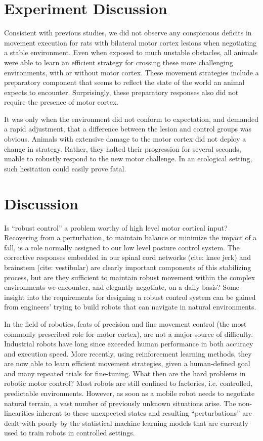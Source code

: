 \section{Experiment Discussion}

Consistent with previous studies, we did not observe any conspicuous deficits in movement execution for rats with bilateral motor cortex lesions when negotiating a stable environment. Even when exposed to much unstable obstacles, all animals were able to learn an efficient strategy for crossing these more challenging environments, with or without motor cortex. These movement strategies include a preparatory component that seems to reflect the state of the world an animal expects to encounter. Surprisingly, these preparatory responses also did not require the presence of motor cortex.

It was only when the environment did not conform to expectation, and demanded a rapid adjustment, that a difference between the lesion and control groups was obvious. Animals with extensive damage to the motor cortex did not deploy a change in strategy. Rather, they halted their progression for several seconds, unable to robustly respond to the new motor challenge. In an ecological setting, such hesitation could easily prove fatal.

\section{Discussion}

Is “robust control” a problem worthy of high level motor cortical input? Recovering from a perturbation, to maintain balance or minimize the impact of a fall, is a role normally assigned to our low level posture control system. The corrective responses embedded in our spinal cord networks (cite: knee jerk) and brainstem (cite: vestibular) are clearly important components of this stabilizing process, but are they sufficient to maintain robust movement within the complex environments we encounter, and elegantly negotiate, on a daily basis? Some insight into the requirements for designing a robust control system can be gained from engineers’ trying to build robots that can navigate in natural environments.

In the field of robotics, feats of precision and fine movement control (the most commonly prescribed role for motor cortex), are not a major source of difficulty. Industrial robots have long since exceeded human performance in both accuracy and execution speed. More recently, using reinforcement learning methods, they are now able to learn efficient movement strategies, given a human-defined goal and many repeated trials for fine-tuning. What then are the hard problems in robotic motor control? Most robots are still confined to factories, i.e. controlled, predictable environments. However, as soon as a mobile robot needs to negotiate natural terrain, a vast number of previously unknown situations arise. The non-linearities inherent to these unexpected states and resulting “perturbations” are dealt with poorly by the statistical machine learning models that are currently used to train robots in controlled settings.

